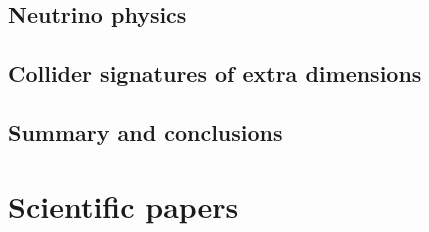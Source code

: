 \documentclass[nocoverpage,swedish,g5paper]{thesis}
\begin{document}
\chapter{Neutrino physics}\label{ch:NeutrinoPhysics}


\chapter{Collider signatures of extra dimensions}\label{ch:ColliderPhenomenology}


\chapter{Summary and conclusions}\label{ch:Summary}



%




\part{Scientific papers}


\end{document}
